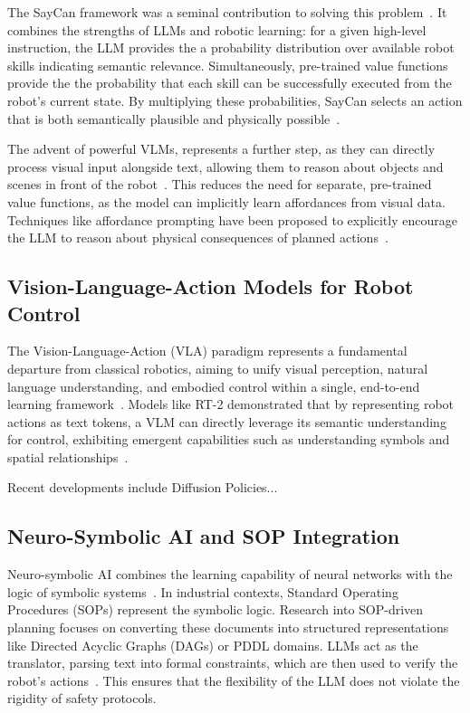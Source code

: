 \documentclass[11pt, a4paper]{article}
\begin{document}
The SayCan framework was a seminal contribution to solving this problem~\cite{Ahn2022}. It combines the strengths of LLMs and robotic learning: for a given high-level instruction, the LLM provides the a probability distribution over available robot skills indicating semantic relevance. Simultaneously, pre-trained value functions provide the the probability that each skill can be successfully executed from the robot's current state. By multiplying these probabilities, SayCan selects an action that is both semantically plausible and physically possible~\cite{Ahn2022}.

The advent of powerful VLMs, represents a further step, as they can directly process visual input alongside text, allowing them to reason about objects and scenes in front of the robot~\cite{Chi2023}. This reduces the need for separate, pre-trained value functions, as the model can implicitly learn affordances from visual data. Techniques like affordance prompting have been proposed to explicitly encourage the LLM to reason about physical consequences of planned actions~\cite{Yu2024}.

\subsection{Vision-Language-Action Models for Robot Control}

The Vision-Language-Action (VLA) paradigm represents a fundamental departure from classical robotics, aiming to unify visual perception, natural language understanding, and embodied control within a single, end-to-end learning framework~\cite{Wei2022}. Models like RT-2 demonstrated that by representing robot actions as text tokens, a VLM can directly leverage its semantic understanding for control, exhibiting emergent capabilities such as understanding symbols and spatial relationships~\cite{Ahn2022}.

Recent developments include Diffusion Policies...

\subsection{Neuro-Symbolic AI and SOP Integration}

Neuro-symbolic AI combines the learning capability of neural networks with the logic of symbolic systems~\cite{Singh2023}. In industrial contexts, Standard Operating Procedures (SOPs) represent the symbolic logic. Research into SOP-driven planning focuses on converting these documents into structured representations like Directed Acyclic Graphs (DAGs) or PDDL domains. LLMs act as the translator, parsing text into formal constraints, which are then used to verify the robot's actions~\cite{Singh2023}. This ensures that the flexibility of the LLM does not violate the rigidity of safety protocols.
\end{document}
